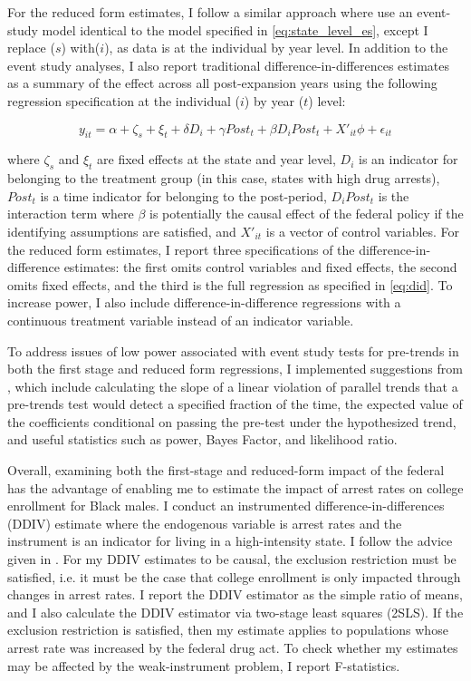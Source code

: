 \documentclass{article}
\begin{document}
For the reduced form estimates, I follow a similar approach where use an event-study model identical to the model specified in \ref{eq:state_level_es}, except I replace ($s$) with($i$), as data is at the individual by year level. In addition to the event study analyses, I also report traditional difference-in-differences estimates as a summary of the effect across all post-expansion years using the following regression specification at the individual ($i$) by year ($t$) level: 

\begin{equation} \label{eq:did}
  y_{it} = \alpha + \zeta_s + \xi_t + \delta D_i + \gamma Post_t + \beta D_i Post_t + X'_{it}\phi + \epsilon_{it}
\end{equation}

where $\zeta_s$ and $\xi_t$ are fixed effects at the state and year level, $D_{i}$ is an indicator for belonging to the treatment group (in this case, states with high drug arrests), $Post_t$ is a time indicator for belonging to the post-period, $D_i Post_t$ is the interaction term where $\beta$ is potentially the causal effect of the federal policy if the identifying assumptions are satisfied, and $X'_{it}$ is a vector of control variables. For the reduced form estimates, I report three specifications of the difference-in-difference estimates: the first omits control variables and fixed effects, the second omits fixed effects, and the third is the full regression as specified in \ref{eq:did}. To increase power, I also include difference-in-difference regressions with a continuous treatment variable instead of an indicator variable.

To address issues of low power associated with event study tests for pre-trends in both the first stage and reduced form regressions, I implemented suggestions from \cite{roth2022}, which include calculating the slope of a linear violation of parallel trends that a pre-trends test would detect a specified fraction of the time, the expected value of the coefficients conditional on passing the pre-test under the hypothesized trend, and useful statistics such as power, Bayes Factor, and likelihood ratio.

Overall, examining both the first-stage and reduced-form impact of the federal has the advantage of enabling me to estimate the impact of arrest rates on college enrollment for Black males. I conduct an instrumented difference-in-differences (DDIV) estimate where the endogenous variable is arrest rates and the instrument is an indicator for living in a high-intensity state. I follow the advice given in \cite{ddiv}. For my DDIV estimates to be causal, the exclusion restriction must be satisfied, i.e. it must be the case that college enrollment is only impacted through changes in arrest rates.  I report the DDIV estimator as the simple ratio of means, and I also calculate the DDIV estimator via two-stage least squares (2SLS). If the exclusion restriction is satisfied, then my estimate applies to populations whose arrest rate was increased by the federal drug act. To check whether my estimates may be affected by the weak-instrument problem, I report F-statistics.
\end{document}
